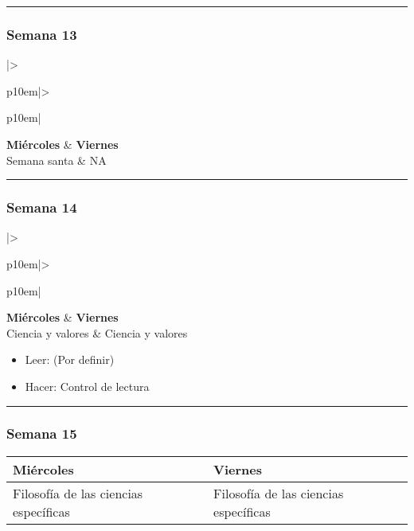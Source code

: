 \documentclass[spanish,]{article}
\begin{document}
\begin{center}\rule{0.5\linewidth}{\linethickness}\end{center}

\subsubsection{Semana 13}\label{semana-13}

\begin{tabular}{|>{\raggedright\arraybackslash}p{10em}|>{\raggedright\arraybackslash}p{10em}|}
\hline
\textbf{Miércoles} & \textbf{Viernes}\\
\hline
Semana santa & NA\\
\hline
\end{tabular}

\begin{center}\rule{0.5\linewidth}{\linethickness}\end{center}

\subsubsection{Semana 14}\label{semana-14}

\begin{tabular}{|>{\raggedright\arraybackslash}p{10em}|>{\raggedright\arraybackslash}p{10em}|}
\hline
\textbf{Miércoles} & \textbf{Viernes}\\
\hline
Ciencia y valores & Ciencia y valores\\
\hline
\end{tabular}

\begin{itemize}
\item
  Leer: (Por definir)
\item
  Hacer: Control de lectura
\end{itemize}

\begin{center}\rule{0.5\linewidth}{\linethickness}\end{center}

\subsubsection{Semana 15}\label{semana-15}

\begin{tabular}{|>{\raggedright\arraybackslash}p{10em}|>{\raggedright\arraybackslash}p{10em}|}
\hline
\textbf{Miércoles} & \textbf{Viernes}\\
\hline
Filosofía de las ciencias específicas & Filosofía de las ciencias específicas\\
\hline
\end{tabular}
\end{document}
